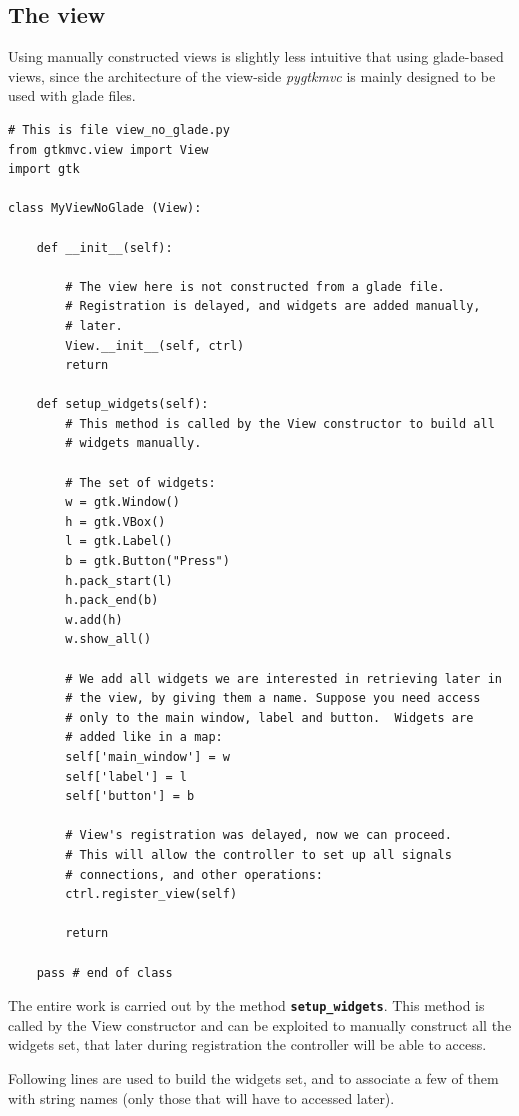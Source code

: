 \documentclass{article}
\newcommand{\kw}[1]{\emph{#1}\xspace}
\newcommand{\pygtkmvc}{\kw{pygtkmvc}}
\newcommand{\codename}[1]{\texttt{\bfseries \textcolor {codecolor}{#1}}\xspace}
\newcommand{\codesize}{\small } %
\begin{document}
\subsection{The view}
Using manually constructed views is slightly less intuitive that using
glade-based views, since the architecture of the view-side \pygtkmvc
is mainly designed to be used with glade files.

{ \codesize 
\begin{verbatim}   
# This is file view_no_glade.py
from gtkmvc.view import View
import gtk

class MyViewNoGlade (View):

    def __init__(self):

        # The view here is not constructed from a glade file.
        # Registration is delayed, and widgets are added manually,
        # later.
        View.__init__(self, ctrl)
        return    

    def setup_widgets(self): 
        # This method is called by the View constructor to build all
        # widgets manually.

        # The set of widgets:
        w = gtk.Window()
        h = gtk.VBox()
        l = gtk.Label()
        b = gtk.Button("Press")
        h.pack_start(l)
        h.pack_end(b)
        w.add(h)
        w.show_all()

        # We add all widgets we are interested in retrieving later in
        # the view, by giving them a name. Suppose you need access
        # only to the main window, label and button.  Widgets are
        # added like in a map:
        self['main_window'] = w
        self['label'] = l
        self['button'] = b
        
        # View's registration was delayed, now we can proceed.
        # This will allow the controller to set up all signals
        # connections, and other operations:
        ctrl.register_view(self)

        return

    pass # end of class
\end{verbatim}
} 

The entire work is carried out by the method
\codename{setup\_widgets}. This method is called by the View
constructor and can be exploited to manually construct all the
widgets set, that later during registration the controller will be
able to access.

Following lines are used to build the widgets set, and to associate a
few of them with string names (only those that will have to accessed
later).
\end{document}
